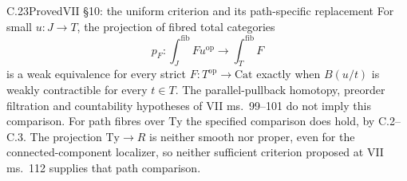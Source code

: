 \begin{claim}{C.23}{Proved}{VII \S10: the uniform criterion and its path-specific replacement}
For small $u:J\to T$, the projection of fibred total categories
\[
 p_F:\int_J^{\mathrm{fib}}Fu^{\mathrm{op}}
               \longrightarrow\int_T^{\mathrm{fib}}F
\]
is a weak equivalence for every strict $F:T^{\mathrm{op}}\to
\mathrm{Cat}$ exactly when $B(u/t)$ is weakly contractible for
every $t\in T$. The parallel-pullback homotopy, preorder filtration
and countability hypotheses of VII ms.~99--101 do not imply this
comparison. For path fibres over $\mathrm{Ty}$ the specified
comparison does hold, by C.2--C.3. The projection
$\mathrm{Ty}\to R$ is neither smooth nor proper, even for the
connected-component localizer, so neither sufficient criterion
proposed at VII ms.~112 supplies that path comparison.
\end{claim}
